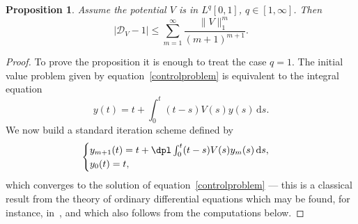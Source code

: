 \documentclass[JEP,XML,SOM,Unicode,NoEqCountersInSection,NoFloatCountersInSection]{cedram}
\theoremstyle{plain}
\newtheorem{prop}[theorem]{Proposition}
\theoremstyle{definition}
\newcommand{\DD}{\mathscr{D}}
\renewcommand{\d}{\mathrm{d}}
\let\balpha q
\begin{document}
\begin{prop}\label{thmupperbound}
Assume the potential $V$ is in $L^{\balpha}[0,1]$, $\balpha \in [1,\infty]$.
Then
\[
\left| \DD_V-1\right|\leq \sum_{m=1}^{\infty} \frac{ \|V\|_{1}^{m}}{ (m+1)^{m+1}}.
\]
\end{prop}
\begin{proof}
To prove the proposition it is enough to treat the case $\balpha=1$.
The initial value problem given by equation~\eqref{controlproblem} is equivalent to the integral equation
\[
y(t) = t + {\int_{0}^{t}}(t-s)V(s)y(s) \, \d s.
\]
We now build a standard iteration scheme defined by
\begin{equation}\label{iterationsch}
\begin{cases}
y_{m+1}(t)=t+\dpl\int_{0}^{t}(t-s)V(s)y_{m}(s) \, \d s,\\
y_{0}(t)=t,
\end{cases}
\end{equation}
which converges to the solution of equation~\eqref{controlproblem} --- this is a classical result from the theory of ordinary differential
equations which may be found, for instance, in~\cite{CL}, and which also follows from the computations below.


\end{proof}
\end{document}
